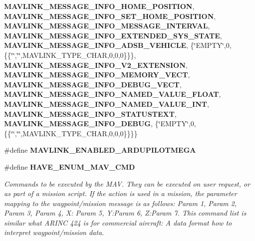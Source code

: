\begin{DoxyCompactItemize}
\textbf{ M\+A\+V\+L\+I\+N\+K\+\_\+\+M\+E\+S\+S\+A\+G\+E\+\_\+\+I\+N\+F\+O\+\_\+\+H\+O\+M\+E\+\_\+\+P\+O\+S\+I\+T\+I\+ON}, \textbf{ M\+A\+V\+L\+I\+N\+K\+\_\+\+M\+E\+S\+S\+A\+G\+E\+\_\+\+I\+N\+F\+O\+\_\+\+S\+E\+T\+\_\+\+H\+O\+M\+E\+\_\+\+P\+O\+S\+I\+T\+I\+ON}, \textbf{ M\+A\+V\+L\+I\+N\+K\+\_\+\+M\+E\+S\+S\+A\+G\+E\+\_\+\+I\+N\+F\+O\+\_\+\+M\+E\+S\+S\+A\+G\+E\+\_\+\+I\+N\+T\+E\+R\+V\+AL}, \textbf{ M\+A\+V\+L\+I\+N\+K\+\_\+\+M\+E\+S\+S\+A\+G\+E\+\_\+\+I\+N\+F\+O\+\_\+\+E\+X\+T\+E\+N\+D\+E\+D\+\_\+\+S\+Y\+S\+\_\+\+S\+T\+A\+TE}, \textbf{ M\+A\+V\+L\+I\+N\+K\+\_\+\+M\+E\+S\+S\+A\+G\+E\+\_\+\+I\+N\+F\+O\+\_\+\+A\+D\+S\+B\+\_\+\+V\+E\+H\+I\+C\+LE}, \{\char`\"{}E\+M\+P\+TY\char`\"{},0,\{\{\char`\"{}\char`\"{},\char`\"{}\char`\"{},M\+A\+V\+L\+I\+N\+K\+\_\+\+T\+Y\+P\+E\+\_\+\+C\+H\+AR,0,0,0\}\}\}, \textbf{ M\+A\+V\+L\+I\+N\+K\+\_\+\+M\+E\+S\+S\+A\+G\+E\+\_\+\+I\+N\+F\+O\+\_\+\+V2\+\_\+\+E\+X\+T\+E\+N\+S\+I\+ON}, \textbf{ M\+A\+V\+L\+I\+N\+K\+\_\+\+M\+E\+S\+S\+A\+G\+E\+\_\+\+I\+N\+F\+O\+\_\+\+M\+E\+M\+O\+R\+Y\+\_\+\+V\+E\+CT}, \textbf{ M\+A\+V\+L\+I\+N\+K\+\_\+\+M\+E\+S\+S\+A\+G\+E\+\_\+\+I\+N\+F\+O\+\_\+\+D\+E\+B\+U\+G\+\_\+\+V\+E\+CT}, \textbf{ M\+A\+V\+L\+I\+N\+K\+\_\+\+M\+E\+S\+S\+A\+G\+E\+\_\+\+I\+N\+F\+O\+\_\+\+N\+A\+M\+E\+D\+\_\+\+V\+A\+L\+U\+E\+\_\+\+F\+L\+O\+AT}, \textbf{ M\+A\+V\+L\+I\+N\+K\+\_\+\+M\+E\+S\+S\+A\+G\+E\+\_\+\+I\+N\+F\+O\+\_\+\+N\+A\+M\+E\+D\+\_\+\+V\+A\+L\+U\+E\+\_\+\+I\+NT}, \textbf{ M\+A\+V\+L\+I\+N\+K\+\_\+\+M\+E\+S\+S\+A\+G\+E\+\_\+\+I\+N\+F\+O\+\_\+\+S\+T\+A\+T\+U\+S\+T\+E\+XT}, \textbf{ M\+A\+V\+L\+I\+N\+K\+\_\+\+M\+E\+S\+S\+A\+G\+E\+\_\+\+I\+N\+F\+O\+\_\+\+D\+E\+B\+UG}, \{\char`\"{}E\+M\+P\+TY\char`\"{},0,\{\{\char`\"{}\char`\"{},\char`\"{}\char`\"{},M\+A\+V\+L\+I\+N\+K\+\_\+\+T\+Y\+P\+E\+\_\+\+C\+H\+AR,0,0,0\}\}\}\}
\item 
\#define \textbf{ M\+A\+V\+L\+I\+N\+K\+\_\+\+E\+N\+A\+B\+L\+E\+D\+\_\+\+A\+R\+D\+U\+P\+I\+L\+O\+T\+M\+E\+GA}
\item 
\#define \textbf{ H\+A\+V\+E\+\_\+\+E\+N\+U\+M\+\_\+\+M\+A\+V\+\_\+\+C\+MD}
\begin{DoxyCompactList}\small\item\em Commands to be executed by the M\+AV. They can be executed on user request, or as part of a mission script. If the action is used in a mission, the parameter mapping to the waypoint/mission message is as follows\+: Param 1, Param 2, Param 3, Param 4, X\+: Param 5, Y\+:Param 6, Z\+:Param 7. This command list is similar what A\+R\+I\+NC 424 is for commercial aircraft\+: A data format how to interpret waypoint/mission data. \end{DoxyCompactList}\item 

\end{DoxyCompactItemize}
